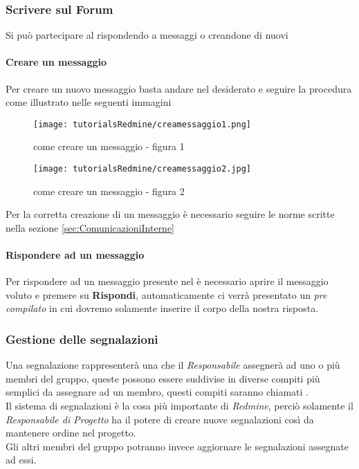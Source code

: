 \documentclass{scalatekids-article}
\begin{document}
\subsubsection{Scrivere sul Forum}
Si può partecipare al  rispondendo a messaggi o creandone di nuovi
\paragraph{Creare un messaggio}
Per creare un nuovo messaggio basta andare nel  desiderato e seguire la procedura come illustrato nelle seguenti immagini
\begin{figure}[H]
  \centering
  \texttt{[image: tutorialsRedmine/creamessaggio1.png]}
  \caption{come creare un messaggio - figura 1}
\end{figure}
\begin{figure}[H]
  \centering
  \texttt{[image: tutorialsRedmine/creamessaggio2.jpg]}
  \caption{come creare un messaggio - figura 2}
\end{figure}
Per la corretta creazione di un messaggio è necessario seguire le norme scritte nella sezione \ref{sec:ComunicazioniInterne}
\paragraph{Rispondere ad un messaggio}
Per rispondere ad un messaggio presente nel  è necessario aprire il messaggio voluto e premere su \textbf{Rispondi}, automaticamente ci verrà presentato un  \textit{pre compilato} in cui dovremo solamente inserire il corpo della nostra risposta.
\subsubsection{Gestione delle segnalazioni}
Una segnalazione rappresenterà una  che il \textit{Responsabile} assegnerà ad uno o più membri del gruppo, queste  possono essere suddivise in diverse compiti più semplici da assegnare ad un membro, questi compiti saranno chiamati .\\
Il sistema di segnalazioni è la cosa più importante di \textit{Redmine}, perciò solamente il \textit{Responsabile di Progetto} ha il potere di creare nuove segnalazioni così da mantenere ordine nel progetto. \\Gli altri membri del gruppo potranno invece aggiornare le segnalazioni assegnate ad essi.
\end{document}
